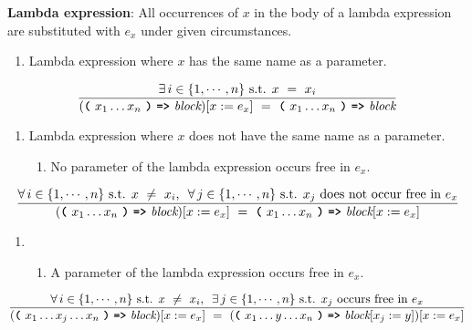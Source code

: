 \vspace{10mm}
\textbf{Lambda expression}: All occurrences of $x$ in the body of a lambda expression are substituted with $e_x$ under given circumstances.
\begin{enumerate}[label=\large\protect\textcircled{\small\arabic*}]
    \item Lambda expression where $x$ has the same name as a parameter.
\end{enumerate}
    \[
    \frac{
      \exists \, i \in \{1, \cdots, n\} \text{ s.t. } x \ = \ x_i
    }{
      (\textbf{\texttt{(}}\ x_1 \ldots x_n \ \textbf{\texttt{)}}\ \textbf{\texttt{=>}}\ \textit{block})[x := e_x]
      \ = \ 
      \textbf{\texttt{(}}\ x_1 \ldots x_n \ \textbf{\texttt{)}}\ \textbf{\texttt{=>}}\ \textit{block}
    }
    \]
\vspace{3mm}
\begin{enumerate}[label=\large\protect\textcircled{\small\arabic*}, start=2]
    \item Lambda expression where $x$ does not have the same name as a parameter.
    \begin{enumerate}[label=(\,\roman*\,)]
        \item No parameter of the lambda expression occurs free in $e_x$.
    \end{enumerate}
\end{enumerate}
        \[
        \frac{
          \forall \, i \in \{1, \cdots, n\} \text{ s.t. } x \ \neq \ x_i \text{, } \ \forall \, j \in \{1, \cdots, n\} \text{ s.t. } x_j \text{ does not occur free in $e_x$}
        }{
          (\textbf{\texttt{(}}\ x_1 \ldots x_n \ \textbf{\texttt{)}}\ \textbf{\texttt{=>}}\ \textit{block})[x := e_x]
          \ = \ 
          \textbf{\texttt{(}}\ x_1 \ldots x_n \ \textbf{\texttt{)}}\ \textbf{\texttt{=>}}\ \textit{block}[x := e_x]
        }
        \]
\vspace{3mm}
\begin{enumerate}
    \item[]
    \begin{enumerate}[label=(\,\roman*\,), start=2]
        \item A parameter of the lambda expression occurs free in $e_x$.
    \end{enumerate}
\end{enumerate}
        \[
        \frac{
          \forall \, i \in \{1, \cdots, n\} \text{ s.t. } x \ \neq \ x_i \text{, } \ \exists \, j \in \{1, \cdots, n\} \text{ s.t. } x_j \text{ occurs free in $e_x$}
        }{
          (\textbf{\texttt{(}}\ x_1 \ldots x_j \ldots x_n \ \textbf{\texttt{)}}\ \textbf{\texttt{=>}}\ \textit{block})[x := e_x]
          \ = \ 
          (\textbf{\texttt{(}}\ x_1 \ldots y \ldots x_n \ \textbf{\texttt{)}}\ \textbf{\texttt{=>}}\ \textit{block}[x_j := y])[x := e_x]
        }
        \]
